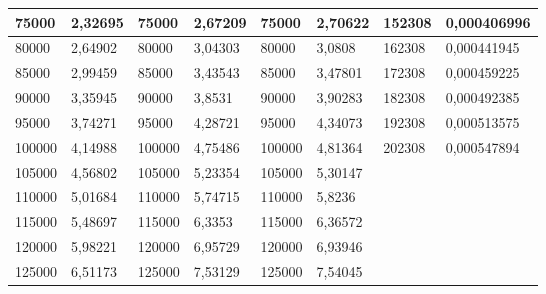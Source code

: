 \documentclass[11pt,openany]{book}
\begin{document}
\begin{table}[!ht]
\begin{tabular}{|l|l|l|l|l|l|l|l|}
        75000 & 2,32695 & 75000 & 2,67209 & 75000 & 2,70622 & 152308 & 0,000406996 \\ \hline
        80000 & 2,64902 & 80000 & 3,04303 & 80000 & 3,0808 & 162308 & 0,000441945 \\ \hline
        85000 & 2,99459 & 85000 & 3,43543 & 85000 & 3,47801 & 172308 & 0,000459225 \\ \hline
        90000 & 3,35945 & 90000 & 3,8531 & 90000 & 3,90283 & 182308 & 0,000492385 \\ \hline
        95000 & 3,74271 & 95000 & 4,28721 & 95000 & 4,34073 & 192308 & 0,000513575 \\ \hline
        100000 & 4,14988 & 100000 & 4,75486 & 100000 & 4,81364 & 202308 & 0,000547894 \\ \hline
        105000 & 4,56802 & 105000 & 5,23354 & 105000 & 5,30147 & ~ & ~ \\ \hline
        110000 & 5,01684 & 110000 & 5,74715 & 110000 & 5,8236 & ~ & ~ \\ \hline
        115000 & 5,48697 & 115000 & 6,3353 & 115000 & 6,36572 & ~ & ~ \\ \hline
        120000 & 5,98221 & 120000 & 6,95729 & 120000 & 6,93946 & ~ & ~ \\ \hline
        125000 & 6,51173 & 125000 & 7,53129 & 125000 & 7,54045 & ~ & \\\hline
    \end{tabular}
\end{table}
\end{document}
